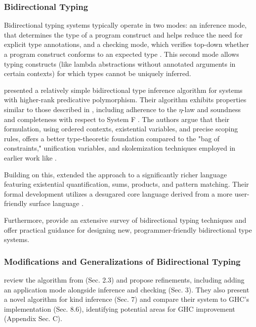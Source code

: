 \subsubsection{Bidirectional Typing}

Bidirectional typing systems typically operate in two modes: an inference mode, that determines the type of a program construct and helps reduce the need for explicit type annotations, and a checking mode, which verifies top-down whether a program construct conforms to an expected type \cite{dunfield-bidirectional-2020}. This second mode allows typing constructs (like lambda abstractions without annotated arguments in certain contexts) for which types cannot be uniquely inferred.

\cite{dunfield-complete-2013} presented a relatively simple bidirectional type inference algorithm for systems with higher-rank predicative polymorphism. Their algorithm exhibits properties similar \cite[Fig. 15]{dunfield-complete-2013} to those described in \cite[Sec.~6]{jones-practical-2007}, including adherence to the $\eta$-law \cite[Ch.~4]{selinger-lecture-2013} and soundness and completeness with respect to System F \cite[Ch.~8]{selinger-lecture-2013}. The authors argue that their formulation, using ordered contexts, existential variables, and precise scoping rules, offers a better type-theoretic foundation compared to the "bag of constraints," unification variables, and skolemization techniques employed in earlier work like \cite{jones-practical-2007}.

Building on this, \citeauthor{dunfield-sound-2019} \cite{dunfield-sound-2019} extended the approach to a significantly richer language featuring existential quantification, sums, products, and pattern matching. Their formal development utilizes a desugared core language \cite[Fig. 11]{dunfield-sound-2019} derived from a more user-friendly surface language \cite[Fig. 1]{dunfield-sound-2019}.

Furthermore, \cite{dunfield-bidirectional-2020} provide an extensive survey of bidirectional typing techniques and offer practical guidance for designing new, programmer-friendly bidirectional type systems.

\subsubsection{Modifications and Generalizations of Bidirectional Typing}

\cite{xie-higher-rank} review the algorithm from \cite{dunfield-complete-2013} (Sec. 2.3) and propose refinements, including adding an application mode alongside inference and checking (Sec. 3). They also present a novel algorithm for kind inference (Sec. 7) and compare their system to GHC's implementation (Sec. 8.6), identifying potential areas for GHC improvement (Appendix Sec. C).

